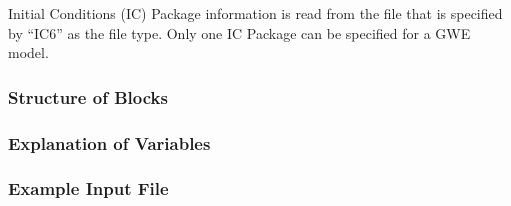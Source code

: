 Initial Conditions (IC) Package information is read from the file that is specified by ``IC6'' as the file type.  Only one IC Package can be specified for a GWE model. 

\vspace{5mm}
\subsubsection{Structure of Blocks}



\vspace{5mm}
\subsubsection{Explanation of Variables}
\begin{description}

\end{description}

\vspace{5mm}
\subsubsection{Example Input File}



